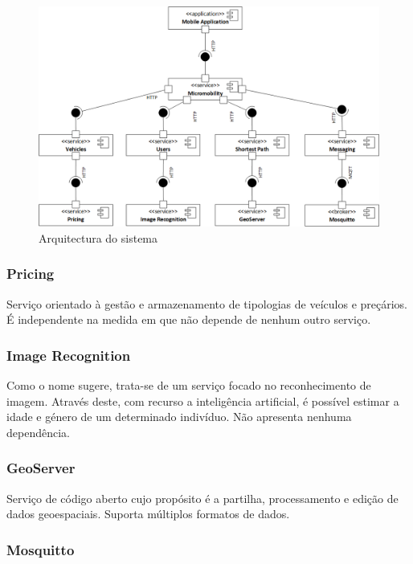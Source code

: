 \begin{figure}[htb]
    \centering
    \includegraphics[width=1\textwidth]{img/system-arch.png}
    \caption{Arquitectura do sistema}
    \label{fig:system-arch}
\end{figure}

\subsubsection{Pricing}

Serviço orientado à gestão e armazenamento de tipologias de veículos e preçários. É independente na medida em que não depende de nenhum outro serviço.

\subsubsection{Image Recognition}

Como o nome sugere, trata-se de um serviço focado no reconhecimento de imagem. Através deste, com recurso a inteligência artificial, é possível estimar a idade e género de um determinado indivíduo. Não apresenta nenhuma dependência. 

\subsubsection{GeoServer}

Serviço de código aberto cujo propósito é a partilha, processamento e edição de dados geoespaciais. Suporta múltiplos formatos de dados.

\subsubsection{Mosquitto}

